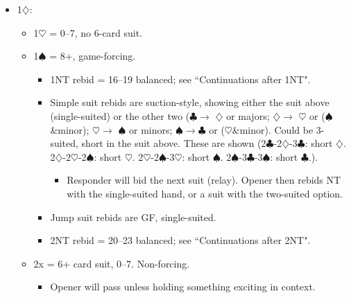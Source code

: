 \documentclass[a4paper,12pt]{article}
\begin{document}
\begin{itemize}
\item 1$\diamondsuit$:
	\begin{itemize}
   \item 1$\heartsuit$ = 0--7, no 6-card suit.
   \item 1$\spadesuit$ = 8+, game-forcing.
		\begin{itemize}
      \item 1NT rebid = 16--19 balanced; see ``Continuations after 1NT".
      \item Simple suit rebids are suction-style, showing either the suit above
         (single-suited) or the other two ($\clubsuit$$\rightarrow$ $\diamondsuit$ or majors; $\diamondsuit$$\rightarrow$ $\heartsuit$ or ($\spadesuit$\&minor); $\heartsuit$$\rightarrow$
         $\spadesuit$ or minors; $\spadesuit$$\rightarrow$$\clubsuit$ or ($\heartsuit$\&minor). Could be 3-suited, short in the suit
         above. These are shown (2$\clubsuit$-2$\diamondsuit$-3$\clubsuit$: short $\diamondsuit$. 2$\diamondsuit$-2$\heartsuit$-2$\spadesuit$: short $\heartsuit$. 2$\heartsuit$-2$\spadesuit$-3$\heartsuit$:
         short $\spadesuit$. 2$\spadesuit$-3$\clubsuit$-3$\spadesuit$: short $\clubsuit$.).
			\begin{itemize}
			\item Responder will bid the next suit (relay). Opener then rebids NT with the
				single-suited hand, or a suit with the two-suited option.
			\end{itemize}
      \item Jump suit rebids are GF, single-suited.
      \item 2NT rebid = 20--23 balanced; see ``Continuations after 2NT".
		\end{itemize}
   \item 2x = 6+ card suit, 0--7. Non-forcing.
		\begin{itemize}
      \item Opener will pass unless holding something exciting in context.
		\end{itemize}
	\end{itemize}


\end{itemize}
\end{document}
